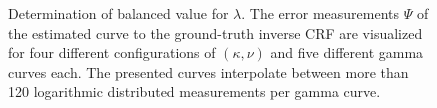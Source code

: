 \begin{figure}[tb]
	\centering
  \caption[Determination of balanced value for $\lambda$]{Determination of balanced value for $\lambda$. The error measurements $\Psi$ of the estimated curve to the ground-truth inverse CRF are visualized for four different configurations of $(\kappa, \nu)$ and five different gamma curves each. The presented curves interpolate between more than 120 logarithmic distributed measurements per gamma curve.}
	\label{fig:goodlambda}
\end{figure}

